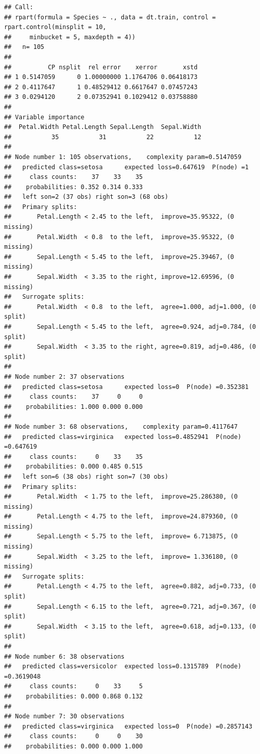 \documentclass[]{book}
\theoremstyle{plain}
\theoremstyle{definition}
\begin{document}
\begin{verbatim}
## Call:
## rpart(formula = Species ~ ., data = dt.train, control = rpart.control(minsplit = 10, 
##     minbucket = 5, maxdepth = 4))
##   n= 105 
## 
##          CP nsplit  rel error    xerror       xstd
## 1 0.5147059      0 1.00000000 1.1764706 0.06418173
## 2 0.4117647      1 0.48529412 0.6617647 0.07457243
## 3 0.0294120      2 0.07352941 0.1029412 0.03758880
## 
## Variable importance
##  Petal.Width Petal.Length Sepal.Length  Sepal.Width 
##           35           31           22           12 
## 
## Node number 1: 105 observations,    complexity param=0.5147059
##   predicted class=setosa      expected loss=0.647619  P(node) =1
##     class counts:    37    33    35
##    probabilities: 0.352 0.314 0.333 
##   left son=2 (37 obs) right son=3 (68 obs)
##   Primary splits:
##       Petal.Length < 2.45 to the left,  improve=35.95322, (0 missing)
##       Petal.Width  < 0.8  to the left,  improve=35.95322, (0 missing)
##       Sepal.Length < 5.45 to the left,  improve=25.39467, (0 missing)
##       Sepal.Width  < 3.35 to the right, improve=12.69596, (0 missing)
##   Surrogate splits:
##       Petal.Width  < 0.8  to the left,  agree=1.000, adj=1.000, (0 split)
##       Sepal.Length < 5.45 to the left,  agree=0.924, adj=0.784, (0 split)
##       Sepal.Width  < 3.35 to the right, agree=0.819, adj=0.486, (0 split)
## 
## Node number 2: 37 observations
##   predicted class=setosa      expected loss=0  P(node) =0.352381
##     class counts:    37     0     0
##    probabilities: 1.000 0.000 0.000 
## 
## Node number 3: 68 observations,    complexity param=0.4117647
##   predicted class=virginica   expected loss=0.4852941  P(node) =0.647619
##     class counts:     0    33    35
##    probabilities: 0.000 0.485 0.515 
##   left son=6 (38 obs) right son=7 (30 obs)
##   Primary splits:
##       Petal.Width  < 1.75 to the left,  improve=25.286380, (0 missing)
##       Petal.Length < 4.75 to the left,  improve=24.879360, (0 missing)
##       Sepal.Length < 5.75 to the left,  improve= 6.713875, (0 missing)
##       Sepal.Width  < 3.25 to the left,  improve= 1.336180, (0 missing)
##   Surrogate splits:
##       Petal.Length < 4.75 to the left,  agree=0.882, adj=0.733, (0 split)
##       Sepal.Length < 6.15 to the left,  agree=0.721, adj=0.367, (0 split)
##       Sepal.Width  < 3.15 to the left,  agree=0.618, adj=0.133, (0 split)
## 
## Node number 6: 38 observations
##   predicted class=versicolor  expected loss=0.1315789  P(node) =0.3619048
##     class counts:     0    33     5
##    probabilities: 0.000 0.868 0.132 
## 
## Node number 7: 30 observations
##   predicted class=virginica   expected loss=0  P(node) =0.2857143
##     class counts:     0     0    30
##    probabilities: 0.000 0.000 1.000
\end{verbatim}
\end{document}
